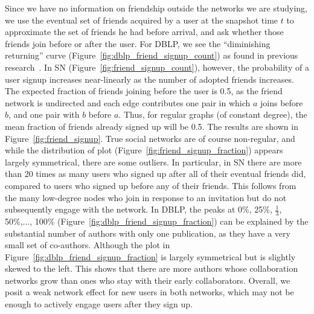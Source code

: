 \documentclass[phd,tocprelim]{cornell}
\begin{document}
Since we have no information on friendship outside the networks we are studying, we use the eventual set of friends acquired by a user at the snapshot time $t$ to approximate the set of friends he had before arrival, and ask whether those friends join before or after the user.
For DBLP, we see the ``diminishing returning'' curve (Figure~\ref{fig:dblp_friend_signup_count}) as found in previous
research~\cite{Backstrom:2006}. In SN (Figure~\ref{fig:friend_signup_count}), however, the probability of a user signup increases
near-linearly as the number of
adopted friends increases.
The expected fraction of friends joining before the user is 0.5,
as the friend network is undirected and each edge
contributes one pair in which $a$ joins before $b$, and one pair with
$b$ before $a$.  Thus, for regular graphs (of
constant degree), the mean fraction of friends
already signed up will be 0.5.  The results are shown in
Figure~\ref{fig:friend_signup}.  True social networks are of course
non-regular, and while the distribution of plot
(Figure~\ref{fig:friend_signup_fraction}) appears largely symmetrical,
there are some outliers.  In particular, in SN there are more than 20
times as many users who signed up after all of their eventual friends did,
compared to users who signed up before any of their friends. This follows from the many
low-degree nodes who join in response to an invitation but do not subsequently
engage with the network.  In DBLP, the peaks at 0\%, 25\%, $\frac{1}{3}$, 50\%,..., 100\% (Figure~\ref{fig:dblp_friend_signup_fraction}) can be explained by the substantial number of authors with only one publication, as they have a very small set of co-authors. Although the plot in Figure~\ref{fig:dblp_friend_signup_fraction} is largely symmetrical but is slightly skewed to the left. This shows that there are more authors whose collaboration networks grow than ones who stay with their early collaborators.
Overall, we posit a weak network effect for new users in both networks, which may not be enough to actively engage users after they sign up.

\end{document}
